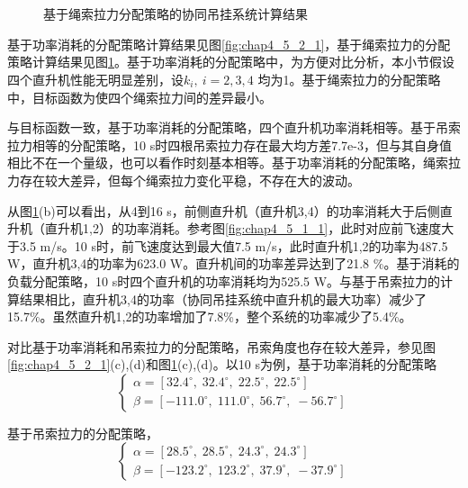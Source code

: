 \begin{figure}[!htb]
  \quad
  \\
  \quad
  \\
  \quad
  \caption{基于绳索拉力分配策略的协同吊挂系统计算结果}
  \label{fig:chap4_5_2_2}
\end{figure}

基于功率消耗的分配策略计算结果见图\ref{fig:chap4_5_2_1}，基于绳索拉力的分配策略计算结果见图\ref{fig:chap4_5_2_2}。基于功率消耗的分配策略中，为方便对比分析，本小节假设四个直升机性能无明显差别，设$k_i,\ i=2,3,4$ 均为1。基于绳索拉力的分配策略中，目标函数为使四个绳索拉力间的差异最小。

与目标函数一致，基于功率消耗的分配策略，四个直升机功率消耗相等。基于吊索拉力相等的分配策略，10 s时四根吊索拉力存在最大均方差7.7e-3，但与其自身值相比不在一个量级，也可以看作时刻基本相等。基于功率消耗的分配策略，绳索拉力存在较大差异，但每个绳索拉力变化平稳，不存在大的波动。

从图\ref{fig:chap4_5_2_2}(b)可以看出，从4到16 s，前侧直升机（直升机3,4）的功率消耗大于后侧直升机（直升机1,2）的功率消耗。参考图\ref{fig:chap4_5_1_1}，此时对应前飞速度大于3.5 m/s。10 s时，前飞速度达到最大值7.5 m/s，此时直升机1,2的功率为487.5 W，直升机3,4的功率为623.0 W。直升机间的功率差异达到了21.8 \%。基于消耗的负载分配策略，10 s时四个直升机的功率消耗均为525.5 W。与基于吊索拉力的计算结果相比，直升机3,4的功率（协同吊挂系统中直升机的最大功率）减少了15.7\%。虽然直升机1,2的功率增加了7.8\%，整个系统的功率减少了5.4\%。

对比基于功率消耗和吊索拉力的分配策略，吊索角度也存在较大差异，参见图\ref{fig:chap4_5_2_1}(c),(d)和图\ref{fig:chap4_5_2_2}(c),(d)。以10 s为例，基于功率消耗的分配策略
\begin{equation}
  \left\{ \begin{array}{l}
    \alpha  = \left[ {32.4^\circ ,\;32.4^\circ ,\;22.5^\circ ,\;22.5^\circ } \right]\\
    \beta  = \left[ { - 111.0^\circ ,\;111.0^\circ ,\;56.7^\circ ,\; - 56.7^\circ } \right]
    \end{array} \right.
    \label{equation:chap_4_add_1}
\end{equation}

基于吊索拉力的分配策略，
\begin{equation}
  \left\{ \begin{array}{l}
    \alpha  = \left[ {28.5^\circ ,\;28.5^\circ ,\;24.3^\circ ,\;24.3^\circ } \right]\\
    \beta  = \left[ { - 123.2^\circ ,\;123.2^\circ ,\;37.9^\circ ,\; - 37.9^\circ } \right]
    \end{array} \right.
    \label{equation:chap_4_add_2}
\end{equation}

